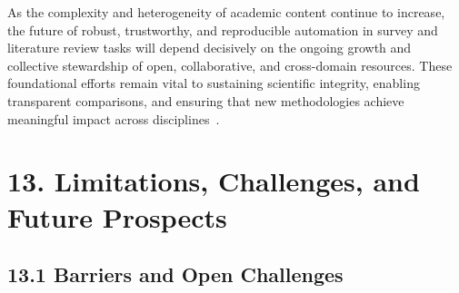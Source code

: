 \documentclass[11pt]{article}
\begin{document}
As the complexity and heterogeneity of academic content continue to increase, the future of robust, trustworthy, and reproducible automation in survey and literature review tasks will depend decisively on the ongoing growth and collective stewardship of open, collaborative, and cross-domain resources. These foundational efforts remain vital to sustaining scientific integrity, enabling transparent comparisons, and ensuring that new methodologies achieve meaningful impact across disciplines~\cite{ref26,ref27,ref31,ref32,ref33,ref34,ref35,ref68,ref78,ref80,ref84,ref98,ref100,ref102,ref104,ref106}.

\section{13. Limitations, Challenges, and Future Prospects}

\subsection{13.1 Barriers and Open Challenges}
\end{document}
